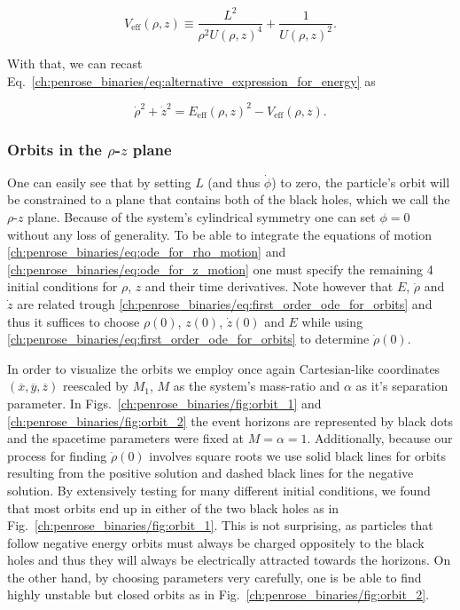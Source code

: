 \begin{equation}
    V_{\text{eff}}(\rho,z) \equiv \frac{L^2}{\rho^2 U(\rho,z)^4} + \frac{1}{U(\rho,z)^2}.
    \label{ch:penrose_binaries/eq:effective_potential_definition}
\end{equation}

With that, we can recast Eq.~\eqref{ch:penrose_binaries/eq:alternative_expression_for_energy} as

\begin{equation}
    \dot{\rho}^2 + \dot{z}^2 = E_{\text{eff}}(\rho,z)^2 - V_{\text{eff}}(\rho,z).
    \label{ch:penrose_binaries/eq:first_order_ode_for_orbits}
\end{equation}

\subsubsection{Orbits in the \texorpdfstring{$\rho$}{$\symit{rho}$}-$z$ plane}

One can easily see that by setting $L$ (and thus $\dot{\phi}$) to zero, the particle's orbit will be constrained to a plane that contains both of the black holes, which we call the $\rho$-$z$ plane. Because of the system's cylindrical symmetry one can set $\phi = 0$ without any loss of generality. To be able to integrate the equations of motion \eqref{ch:penrose_binaries/eq:ode_for_rho_motion} and \eqref{ch:penrose_binaries/eq:ode_for_z_motion} one must specify the remaining 4 initial conditions for $\rho$, $z$ and their time derivatives. Note however that $E$, $\dot{\rho}$ and $\dot{z}$ are related trough \eqref{ch:penrose_binaries/eq:first_order_ode_for_orbits} and thus it suffices to choose $\rho(0)$, $z(0)$, $\dot{z}(0)$ and $E$ while using \eqref{ch:penrose_binaries/eq:first_order_ode_for_orbits} to determine $\dot{\rho}(0)$.

In order to visualize the orbits we employ once again Cartesian-like coordinates $(\overline{x},\overline{y},\overline{z})$ reescaled by $M_1$, $M$ as the system's mass-ratio and $\alpha$ as it's separation parameter. In Figs.~\ref{ch:penrose_binaries/fig:orbit_1} and \ref{ch:penrose_binaries/fig:orbit_2} the event horizons are represented by black dots and the spacetime parameters were fixed at $M = \alpha = 1$. Additionally, because our process for finding $\dot{\rho}(0)$ involves square roots we use solid black lines for orbits resulting from the positive solution and dashed black lines for the negative solution. By extensively testing for many different initial conditions, we found that most orbits end up in either of the two black holes as in Fig.~\ref{ch:penrose_binaries/fig:orbit_1}. This is not surprising, as particles that follow negative energy orbits must always be charged oppositely to the black holes and thus they will always be electrically attracted towards the horizons. On the other hand, by choosing parameters very carefully, one is be able to find highly unstable but closed orbits as in Fig.~\ref{ch:penrose_binaries/fig:orbit_2}.

